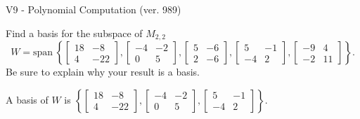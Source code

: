 \begin{exercise}
  \begin{exerciseTitle}V9 - Polynomial Computation (ver. 989)\end{exerciseTitle}
  \begin{exerciseStatement}
    Find a basis for the subspace of \(M_{2,2}\) 
\[W=\mathrm{span}\ \left\{\left[\begin{array}{cc}
18 & -8 \\
4 & -22
\end{array}\right] , \left[\begin{array}{cc}
-4 & -2 \\
0 & 5
\end{array}\right] , \left[\begin{array}{cc}
5 & -6 \\
2 & -6
\end{array}\right] , \left[\begin{array}{cc}
5 & -1 \\
-4 & 2
\end{array}\right] , \left[\begin{array}{cc}
-9 & 4 \\
-2 & 11
\end{array}\right]\right\}.\]
 Be sure to explain why your result is a basis.


  \end{exerciseStatement}
  \begin{exerciseAnswer}
   A basis of \(W\) is  \(\left\{\left[\begin{array}{cc}
18 & -8 \\
4 & -22
\end{array}\right] , \left[\begin{array}{cc}
-4 & -2 \\
0 & 5
\end{array}\right] , \left[\begin{array}{cc}
5 & -1 \\
-4 & 2
\end{array}\right]\right\}\).
  


  \end{exerciseAnswer}
\end{exercise}
